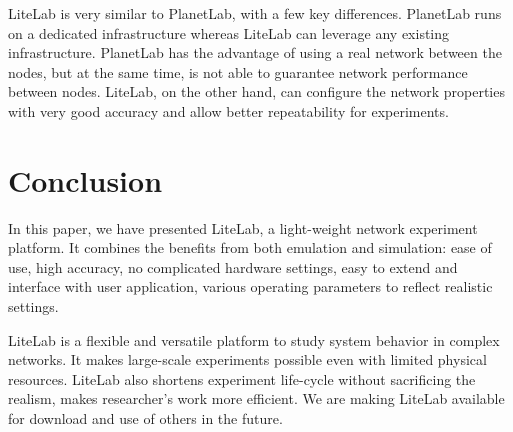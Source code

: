 \documentclass[conference]{IEEEtran}
\begin{document}
LiteLab is very similar to PlanetLab, with a few key
differences. PlanetLab runs on a dedicated infrastructure whereas
LiteLab can leverage any existing infrastructure. PlanetLab has the
advantage of using a real network between the nodes, but at the same
time, is not able to guarantee network performance between
nodes. LiteLab, on the other hand, can configure the network
properties with very good accuracy and allow better repeatability for
experiments.



\section{Conclusion}
\label{sec:conclusion}

In this paper, we have presented LiteLab, a light-weight network
experiment platform.  It combines the benefits from both emulation and
simulation: ease of use, high accuracy, no complicated hardware
settings, easy to extend and interface with user application, various
operating parameters to reflect realistic settings.

LiteLab is a flexible and versatile platform to study system behavior
in complex networks. It makes large-scale experiments possible even
with limited physical resources. LiteLab also shortens experiment
life-cycle without sacrificing the realism, makes researcher's work
more efficient. We are making LiteLab available for download and use
of others in the future.
\end{document}
